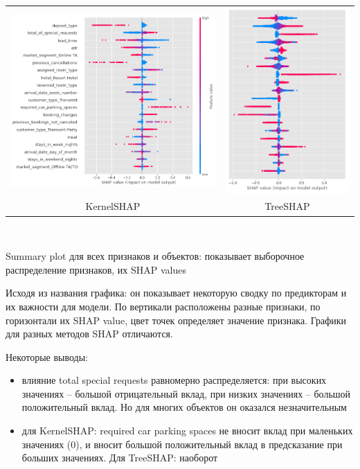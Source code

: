 \noindent
\begin{tabular}{cc}
	\arrayrulecolor[rgb]{0.8,0.85,1}
	\includegraphics[width=0.61\linewidth]{pics/myshap7.png} & \includegraphics[width=0.34\linewidth]{pics/myshap7t.png} \\
	KernelSHAP & TreeSHAP \\
\end{tabular}\\[-5mm]
\begin{center}
	Summary plot для всех признаков и объектов: показывает выборочное распределение признаков, их SHAP values
\end{center}
\vspace{-3mm}

Исходя из названия графика: он показывает некоторую сводку по предикторам и их важности для модели. По вертикали расположены разные признаки, по горизонтали их SHAP value, цвет точек определяет значение признака. Графики для разных методов SHAP отличаются.

Некоторые выводы:\\[-8mm]
\begin{itemize}
	\item влияние total special requests равномерно распределяется: при высоких значениях -- большой отрицательный вклад, при низких значениях -- большой положительный вклад. Но для многих объектов он оказался незначительным\\[-7mm]
	\item для KernelSHAP: required car parking spaces не вносит вклад при маленьких значениях (0), и вносит большой положительный вклад в предсказание при больших значениях. Для TreeSHAP: наоборот\\[-7mm]
\end{itemize}

